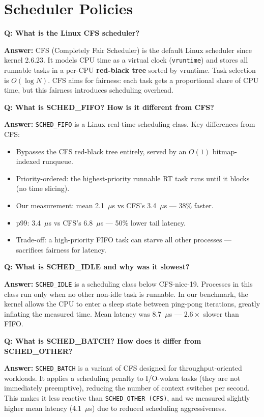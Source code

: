 \documentclass[12pt,a4paper]{article}
\newcommand{\Q}[1]{\begin{mdframed}[style=qbox]
\textbf{\textcolor{qcol}{Q: #1}}\end{mdframed}\vspace{2pt}}
\newcommand{\A}[1]{\begin{mdframed}[style=abox]
\textbf{\textcolor{acol}{Answer:}} #1\end{mdframed}\vspace{10pt}}
\begin{document}
\section{Scheduler Policies}

\Q{What is the Linux CFS scheduler?}
\A{CFS (Completely Fair Scheduler) is the default Linux scheduler since kernel 2.6.23. It models CPU time as a virtual clock (\texttt{vruntime}) and stores all runnable tasks in a per-CPU \textbf{red-black tree} sorted by vruntime. Task selection is $O(\log N)$. CFS aims for fairness: each task gets a proportional share of CPU time, but this fairness introduces scheduling overhead.}

\Q{What is SCHED\_FIFO? How is it different from CFS?}
\A{\texttt{SCHED\_FIFO} is a Linux real-time scheduling class. Key differences from CFS:
\begin{itemize}[nosep]
  \item Bypasses the CFS red-black tree entirely, served by an $O(1)$ bitmap-indexed runqueue.
  \item Priority-ordered: the highest-priority runnable RT task runs until it blocks (no time slicing).
  \item Our measurement: mean 2.1~$\mu$s vs CFS's 3.4~$\mu$s --- 38\% faster.
  \item p99: 3.4~$\mu$s vs CFS's 6.8~$\mu$s --- 50\% lower tail latency.
  \item Trade-off: a high-priority FIFO task can starve all other processes --- sacrifices fairness for latency.
\end{itemize}}

\Q{What is SCHED\_IDLE and why was it slowest?}
\A{\texttt{SCHED\_IDLE} is a scheduling class below CFS-nice-19. Processes in this class run only when no other non-idle task is runnable. In our benchmark, the kernel allows the CPU to enter a sleep state between ping-pong iterations, greatly inflating the measured time. Mean latency was 8.7~$\mu$s --- $2.6\times$ slower than FIFO.}

\Q{What is SCHED\_BATCH? How does it differ from SCHED\_OTHER?}
\A{\texttt{SCHED\_BATCH} is a variant of CFS designed for throughput-oriented workloads. It applies a scheduling penalty to I/O-woken tasks (they are not immediately preemptive), reducing the number of context switches per second. This makes it less reactive than \texttt{SCHED\_OTHER (CFS)}, and we measured slightly higher mean latency (4.1~$\mu$s) due to reduced scheduling aggressiveness.}
\end{document}
